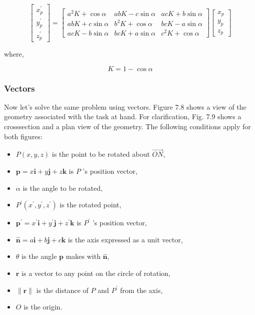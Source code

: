 \documentclass[10pt]{article}
\begin{document}
$$
\left[\begin{array}{l}
x_{p}^{\prime} \\
y_{p}^{\prime} \\
z_{p}^{\prime}
\end{array}\right]=\left[\begin{array}{ccc}
a^{2} K+\cos \alpha & a b K-c \sin \alpha & a c K+b \sin \alpha \\
a b K+c \sin \alpha & b^{2} K+\cos \alpha & b c K-a \sin \alpha \\
a c K-b \sin \alpha & b c K+a \sin \alpha & c^{2} K+\cos \alpha
\end{array}\right]\left[\begin{array}{l}
x_{p} \\
y_{p} \\
z_{p}
\end{array}\right]
$$

where,

$$
K=1-\cos \alpha
$$

\subsubsection{Vectors}
Now let's solve the same problem using vectors. Figure 7.8 shows a view of the geometry associated with the task at hand. For clarification, Fig. 7.9 shows a crosssection and a plan view of the geometry. The following conditions apply for both figures:

\begin{itemize}
  \item $P(x, y, z)$ is the point to be rotated about $\overrightarrow{O N}$,

  \item $\mathbf{p}=x \mathbf{i}+y \mathbf{j}+z \mathbf{k}$ is $P$ 's position vector,

  \item $\alpha$ is the angle to be rotated,

  \item $P^{\prime}\left(x^{\prime}, y^{\prime}, z^{\prime}\right)$ is the rotated point,

  \item $\mathbf{p}^{\prime}=x^{\prime} \mathbf{i}+y^{\prime} \mathbf{j}+z^{\prime} \mathbf{k}$ is $P^{\prime}$ 's position vector,

  \item $\hat{\mathbf{n}}=a \mathbf{i}+b \mathbf{j}+c \mathbf{k}$ is the axis expressed as a unit vector,

  \item $\theta$ is the angle $\mathbf{p}$ makes with $\hat{\mathbf{n}}$,

  \item $\mathbf{r}$ is a vector to any point on the circle of rotation,

  \item $\|\mathbf{r}\|$ is the distance of $P$ and $P^{\prime}$ from the axis,

  \item $O$ is the origin.

\end{itemize}
\end{document}
